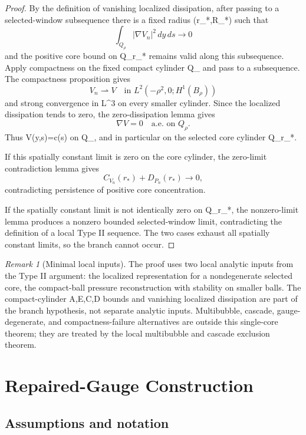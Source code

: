 \documentclass[11pt]{amsart}
\def\({}%
\def\){}%
\theoremstyle{plain}
\theoremstyle{definition}
\theoremstyle{remark}
\newtheorem{remark}[theorem]{Remark}
\begin{document}
\begin{proof}
By the definition of vanishing localized dissipation, after passing to a
selected-window subsequence there is a fixed radius \(\rho\in(r_*,R_*)\) such
that
\[
  \int_{Q_\rho}|\nabla V_n|^2\,dy\,ds\to0
\]
and the positive core bound on \(Q_{r_*}\) remains valid along this subsequence.
Apply compactness on the fixed compact
cylinder \(Q_\rho\) and pass to a subsequence.  The compactness proposition
gives
\[
  V_n\rightharpoonup V\quad\text{in }L^2(-\rho^2,0;H^1(B_\rho))
\]
and strong convergence in \(L^3\) on every smaller cylinder.  Since the
localized dissipation tends to zero, the zero-dissipation lemma gives
\[
  \nabla V=0\quad\text{a.e. on }Q_\rho.
\]
Thus \(V(y,s)=c(s)\) on \(Q_\rho\), and in particular on the selected core
cylinder \(Q_{r_*}\).

If this spatially constant limit is zero on the core cylinder, the zero-limit
contradiction lemma gives
\[
  C_{V_n}(r_*)+D_{P_n}(r_*)\to0,
\]
contradicting persistence of positive core concentration.

If the spatially constant limit is not identically zero on \(Q_{r_*}\), the
nonzero-limit lemma produces a nonzero bounded selected-window limit, contradicting
the definition of a local Type II sequence.  The two cases exhaust all
spatially constant limits, so the branch cannot occur.
\end{proof}

\begin{remark}[Minimal local inputs]
The proof uses two local analytic inputs from the Type II argument: the
localized representation for a nondegenerate selected core, the compact-ball
pressure reconstruction with stability on smaller balls.  The
compact-cylinder \(A,E,C,D\) bounds and vanishing localized dissipation are
part of the branch hypothesis, not separate analytic inputs.  Multibubble,
cascade, gauge-degenerate, and compactness-failure alternatives are outside
this single-core theorem; they are treated by the local multibubble and
cascade exclusion theorem.
\end{remark}

\clearpage
\section{Repaired-Gauge Construction}\label{sec:repaired-gauge-construction}
\subsection{Assumptions and notation}\label{paper2:sec:assumptions}
\end{document}
